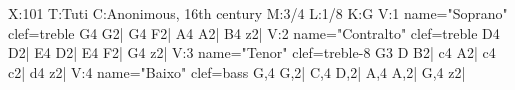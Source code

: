 X:101
T:Tuti
C:Anonimous, 16th century
M:3/4
L:1/8
K:G
V:1 name="Soprano" clef=treble
G4 G2| G4 F2| A4 A2| B4 z2|
V:2 name="Contralto" clef=treble
D4 D2| E4 D2| E4 F2| G4 z2|
V:3 name="Tenor" clef=treble-8
G3 D B2| c4 A2| c4 c2| d4 z2|
V:4 name="Baixo" clef=bass
G,4 G,2| C,4 D,2| A,4 A,2| G,4 z2|
